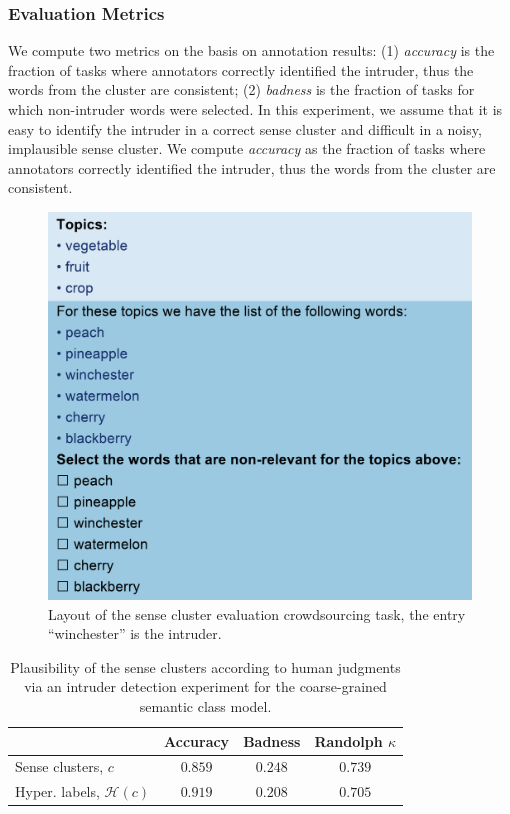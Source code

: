 \documentclass[10pt, a4paper]{article}
\begin{document}
\subsubsection{Evaluation Metrics}

We compute two metrics on the basis on annotation results: (1) \textit{accuracy} is the fraction of tasks where annotators correctly identified the intruder, thus the words from the cluster are consistent; (2) \textit{badness} is the fraction of tasks for which non-intruder words were selected. In this experiment, we assume that it is easy to identify the intruder in a correct sense cluster and difficult in a noisy, implausible sense cluster. We compute \textit{accuracy} as the fraction of tasks where annotators correctly identified the intruder, thus the words from the cluster are consistent.


\begin{figure}[t]
  \centering
  \includegraphics[width=.5\textwidth]{figures/cluster-hit}
  \caption{Layout of the sense cluster evaluation crowdsourcing task, the entry ``winchester'' is the intruder.}
  \label{fig:cluster-hit}
\end{figure}

\begin{table}
\footnotesize
\centering

\begin{tabular}{l|c|c|c}
\textbf{} & \textbf{Accuracy} & \textbf{Badness} & \textbf{Randolph $\kappa$} \\ \toprule
Sense clusters, $c$ & $0.859$ & $0.248$ & $0.739$ \\
Hyper. labels, $\mathcal{H}(c)$  & $0.919$ & $0.208$ & $0.705$ \\
\end{tabular}

\caption{Plausibility of the sense clusters according to human judgments via an intruder detection experiment for the coarse-grained semantic class model.}
\label{tab:exp2-results}
\end{table}
\end{document}
